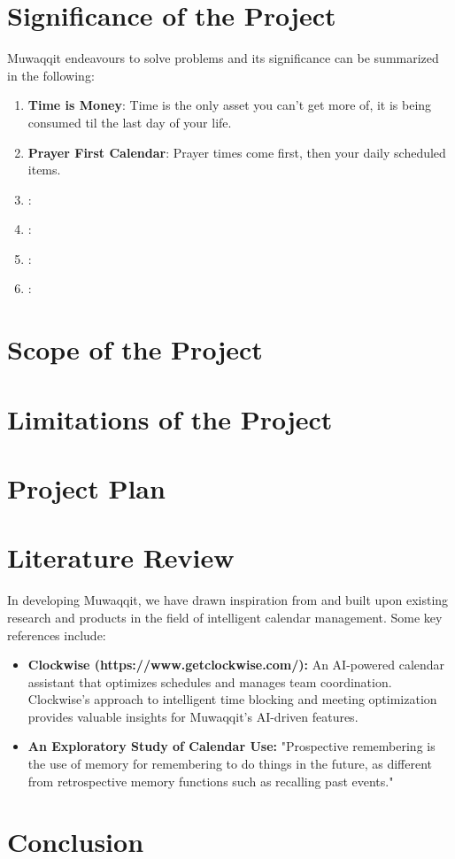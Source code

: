 \documentclass[12pt,a4paper]{article}
\begin{document}
\section{Significance of the Project}

Muwaqqit endeavours to solve problems and its significance can be summarized in the following:

\begin{enumerate}
    \item \textbf{Time is Money}: Time is the only asset you can't get more of, it is being consumed til the last day of your life.
    \item \textbf{Prayer First Calendar}: Prayer times come first, then your daily scheduled items.
    \item \textbf{}: 
    \item \textbf{}: 
    \item \textbf{}: 
    \item \textbf{}: 
\end{enumerate}

\section{Scope of the Project}


\section{Limitations of the Project}


\section{Project Plan}

\section{Literature Review}

In developing Muwaqqit, we have drawn inspiration from and built upon existing research and products in the field of intelligent calendar management. Some key references include:

\begin{itemize}
    \item \textbf{Clockwise (https://www.getclockwise.com/):} An AI-powered calendar assistant that optimizes schedules and manages team coordination. Clockwise's approach to intelligent time blocking and meeting optimization provides valuable insights for Muwaqqit's AI-driven features.
    \item \textbf{An Exploratory Study of Calendar Use:} "Prospective remembering is the use of memory for remembering to do things in the future, as different from retrospective memory functions such as recalling past events."
\end{itemize}

\section{Conclusion}
\end{document}
